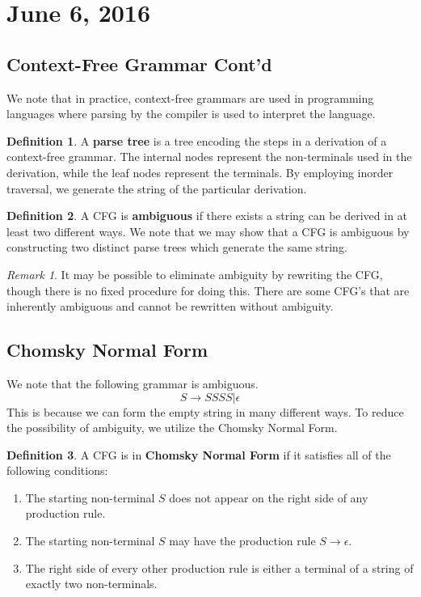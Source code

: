 \documentclass[11pt]{article}
\theoremstyle{plain} %
\theoremstyle{definition}
\newtheorem*{definition}{Definition} %
\theoremstyle{example}
\theoremstyle{remark}
\newtheorem*{remark}{Remark}
\begin{document}
\section{June 6, 2016}

\subsection{Context-Free Grammar Cont'd}

We note that in practice, context-free grammars are used in programming languages where parsing by the compiler is used to interpret the language.

\begin{definition}
A \textbf{parse tree} is a tree encoding the steps in a derivation of a context-free grammar. The internal nodes represent the non-terminals used in the derivation, while the leaf nodes represent the terminals. By employing inorder traversal, we generate the string of the particular derivation.
\end{definition}

\begin{definition}
A CFG is \textbf{ambiguous} if there exists a string can be derived in at least two different ways. We note that we may show that a CFG is ambiguous by constructing two distinct parse trees which generate the same string.
\end{definition}

\begin{remark}
It may be possible to eliminate ambiguity by rewriting the CFG, though there is no fixed procedure for doing this. There are some CFG's that are inherently ambiguous and cannot be rewritten without ambiguity.
\end{remark}

\subsection{Chomsky Normal Form}

We note that the following grammar is ambiguous.$$S \rightarrow SSSS|\epsilon$$ This is because we can form the empty string in many different ways. To reduce the possibility of ambiguity, we utilize the Chomsky Normal Form.

\begin{definition}
A CFG is in \textbf{Chomsky Normal Form} if it satisfies all of the following conditions:

\begin{enumerate}
	\item The starting non-terminal $S$ does not appear on the right side of any production rule.
	\item The starting non-terminal $S$ may have the production rule $S \rightarrow \epsilon$.
	\item The right side of every other production rule is either a terminal of a string of exactly two non-terminals.
\end{enumerate}
\end{definition}
\end{document}
